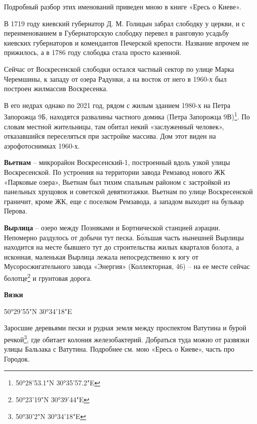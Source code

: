 Подробный разбор этих именований приведен мною в книге «Ересь о Киеве».

В 1719 году киевский губернатор Д. М. Голицын забрал слободку у церкви, и с переименованием в Губернаторскую слободку перевел в ранговую усадьбу киевских губернаторов и комендантов Печерской крепости. Название впрочем не прижилось, а в 1786 году слободка стала просто казенной.

Сейчас от Воскресенской слободки остался частный сектор по улице Марка Черемшины, к западу от озера Радунки, а на восток от него в 1960-х был построен жилмассив Воскресенка. 

В его недрах однако по 2021 год, рядом с жилым зданием 1980-х на Петра Запорожца 9Б, находятся развалины частного домика (Петра Запорожца 9В)\footnote{50°28'53.1"N 30°35'57.2"E}. По словам местной жительницы, там обитал некий «заслуженный человек», отказавшийся переселяться при застройке массива. Дом этот виден на аэрофотоснимках 1960-х.\\

\medskip


\textbf{Вьетнам} – микрорайон Воскресенский-1, построенный вдоль узкой улицы Воскресенской. По устроения на территории завода Ремзавод нового ЖК «Парковые озера», Вьетнам был тихим спальным районом с застройкой из панельных хрущовок и советской девятиэтажки. Вьетнам по улице Воскресенской граничит, кроме ЖК, еще с поселком Ремзавода, а западом выходит на бульвар Перова.\\

\medskip


\textbf{Вырлица} – озеро между Позняками и Бортнической станцией аэрации. Непомерно раздулось от добычи тут песка. Б\'ольшая часть нынешней Вырлицы находится на месте бывшего тут до строительства жилых кварталов болота, а исконная, маленькая Вырлица лежала непосредственно к югу от Мусоросжигательного завода «Энергия» (Коллекторная, 46) – на ее месте сейчас болотце\footnote{50°23'19"N 30°39'44"E} и грунтовая дорога.\\

\medskip


\textbf{Вязки}

50°29'55"N 30°34'18"E

Заросшие деревьями пески и рудная земля между проспектом Ватутина и бурой речкой\footnote{ 50°30'2"N 30°34'18"E}, где обитает колония железобактерий. Добраться туда можно от развязки улицы Бальзака с Ватутина. Подробнее см. мою «Ересь о Киеве», часть про Городок.
